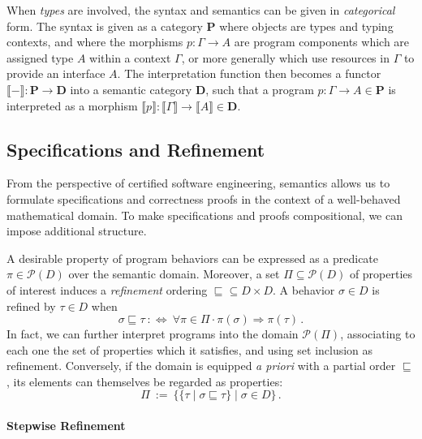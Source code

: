 \documentclass[acmsmall,review,anonymous]{acmart}\settopmatter{printfolios=true,printccs=false,printacmref=false}
\newcommand{\bdot}{\cdot}
\begin{document}
When \emph{types} are involved,
the syntax and semantics
can be given in \emph{categorical} form.
The syntax is given as a category $\mathbf{P}$
where objects are types and typing contexts,
and where the morphisms $p : \Gamma \rightarrow A$
are program components which
are assigned type $A$ within a context $\Gamma$,
or more generally
which use resources in $\Gamma$ to provide an interface $A$.
The interpretation function
then becomes a functor
$\llbracket - \rrbracket : \mathbf{P} \rightarrow \mathbf{D}$
into a semantic category $\mathbf{D}$,
such that a program $p : \Gamma \rightarrow A \in \mathbf{P}$
is interpreted as
a morphism
$\llbracket p \rrbracket :
 \llbracket \Gamma \rrbracket \rightarrow
 \llbracket A \rrbracket
 \in \mathbf{D}$.


\subsection{Specifications and Refinement} \label{sec:specs} %

From the perspective of certified software engineering,
semantics allows us to formulate specifications and
correctness proofs
in the context of a well-behaved mathematical domain.
To make specifications and proofs compositional,
we can impose additional structure.

A desirable property of program behaviors
can be expressed as a predicate $\pi \in \mathcal{P}(D)$
over the semantic domain.
Moreover,
a set $\Pi \subseteq \mathcal{P}(D)$
of properties of interest
induces a \emph{refinement} ordering
${\sqsubseteq} \subseteq D \times D$.
A behavior $\sigma \in D$ is refined by $\tau \in D$
when %
\[
  \sigma \sqsubseteq \tau \: :\Leftrightarrow \:
  \forall \pi \in \Pi \bdot
  \pi(\sigma) \Rightarrow \pi(\tau)
  \,.
\]
In fact, we can further interpret programs
into the domain $\mathcal{P}(\Pi)$,
associating to each one the set of properties
which it satisfies,
and using set inclusion as refinement.
%
Conversely,
if the domain is equipped \emph{a priori}
with a partial order $\sqsubseteq$,
its elements can themselves be regarded as properties:
\[
  \Pi \: := \:
    \{ \{ \tau \mid \sigma \sqsubseteq \tau \} \mid
       \sigma \in D \}
  \,.
\]

\paragraph{Stepwise Refinement}
\end{document}
